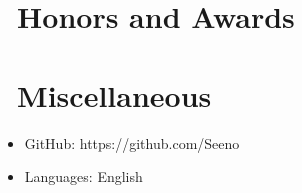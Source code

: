 \documentclass{resume}
\begin{document}
\section{\faHeartO\ Honors and Awards}


\section{\faInfo\ Miscellaneous}
\begin{itemize}[parsep=0.5ex]
  \item GitHub: {\color{blue}https://github.com/Seeno}
  \item Languages: English
\end{itemize}

%
%
\end{document}
